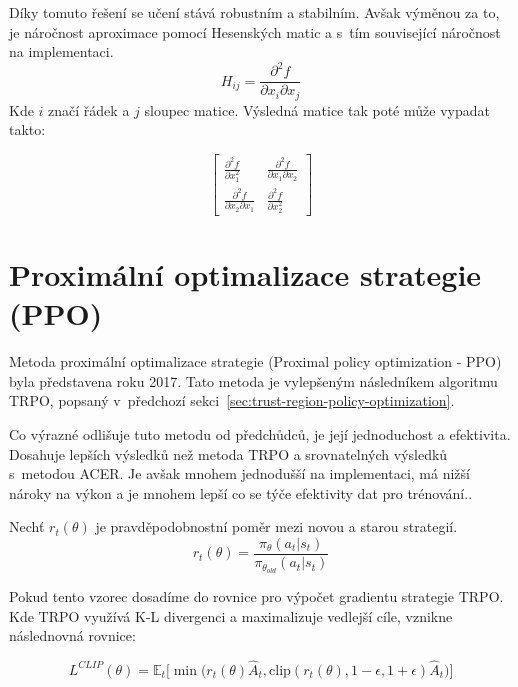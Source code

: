 Díky tomuto řešení se učení stává robustním a stabilním.
Avšak výměnou za to, je náročnost aproximace pomocí Hesenských matic a s~tím související náročnost na implementaci.
\begin{equation}
  H_{ij} = \frac{\partial^2 f}{\partial x_i \partial x_j}
\end{equation}
Kde $i$ značí řádek a $j$ sloupec matice.
Výsledná matice tak poté může vypadat takto:

\begin{equation}
  \begin{bmatrix}
     \frac{\partial^2 f}{\partial x_1^2} & \frac{\partial^2 f}{\partial x_1 \partial x_2} \\
     \frac{\partial^2 f}{\partial x_2 \partial x_1} & \frac{\partial^2 f}{\partial x_2^2}
   \end{bmatrix}
\end{equation}

\section{Proximální optimalizace strategie (PPO)}
\label{sec:proximalni-optimalizace-strategie}


Metoda proximální optimalizace strategie (Proximal policy optimization - PPO) byla představena roku 2017\cite{PPO_paper}.
Tato metoda je vylepšeným následníkem algoritmu TRPO, popsaný v~předchozí sekci~\ref{sec:trust-region-policy-optimization}.

Co výrazné odlišuje tuto metodu od předchůdců, je její jednoduchost a efektivita.
Dosahuje lepších výsledků než metoda TRPO a srovnatelných výsledků s~metodou ACER\@.
Je avšak mnohem jednodušší na implementaci, má nižší nároky na výkon a je mnohem lepší co se týče efektivity dat pro trénování.\cite{PPO_paper}.

Nechť $r_t(\theta)$ je pravděpodobnostní poměr mezi novou a starou strategií.
\begin{equation}
  r_t(\theta) = \frac{\pi_\theta(a_t \vert s_t)}{\pi_{\theta_{old}}(a_t \vert s_t)}
\end{equation}

Pokud tento vzorec dosadíme do rovnice pro výpočet gradientu strategie TRPO. Kde TRPO využívá K-L divergenci a maximalizuje vedlejší cíle, vznikne následnovná rovnice:

\begin{equation}
  L^{CLIP}(\theta) = \mathbb{E}_t \Big[ \min \Big( r_t(\theta) \hat{A}_t, \text{clip}(r_t(\theta), 1-\epsilon, 1+\epsilon) \hat{A}_t \Big) \Big]
\end{equation}

